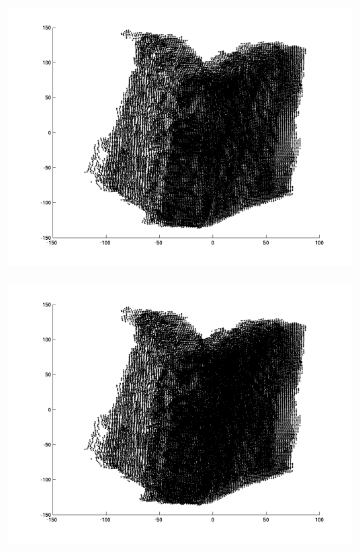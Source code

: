 \begin{figure}[H]
	\begin{subfigure}[b]{0.3\textwidth}
		\centering
		\includegraphics[width=\textwidth]{Images/Book4.png}
		\caption{}
	\end{subfigure}%
	\begin{subfigure}[b]{0.3\textwidth}
		\centering
		\includegraphics[width=\textwidth]{Images/Book5.png}
		\caption{}
	\end{subfigure}
	\begin{subfigure}[b]{0.3\textwidth}
		\centering

\end{subfigure}
\end{figure}
